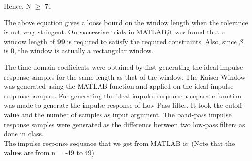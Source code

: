 \documentclass{article}
\begin{document}
\begin{center}
    Hence, N $\geq$ 71
\end{center}

The above equation gives a loose bound on the window length when the tolerance is not very stringent. On successive trials in MATLAB,it was found that a window length of $\textbf{99}$ is required to satisfy
the required constraints. Also, since $\beta$ is 0, the window is actually a rectangular window.
\newline

The time domain coefficients were obtained by first generating the ideal impulse response samples
for the same length as that of the window. The Kaiser Window was generated using the MATLAB
function and applied on the ideal impulse response samples. For generating the ideal impulse response a separate function was made to generate the impulse response of Low-Pass filter. It took the
cutoff value and the number of samples as input argument. The band-pass impulse response samples
were generated as the difference between two low-pass filters as done in class.\\

The impulse response sequence that we get from MATLAB is: (Note that the values are from n = -49 to 49)
\end{document}
